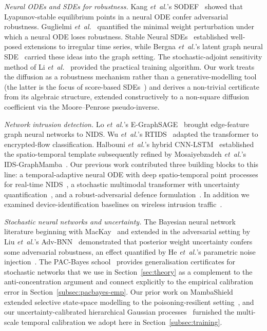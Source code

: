 \documentclass{ieeeaccess}
\begin{document}
\emph{Neural ODEs and SDEs for robustness.} Kang \textit{et~al.}'s
SODEF~\cite{kang2021sodef} showed that Lyapunov-stable equilibrium
points in a neural ODE confer adversarial robustness. Guglielmi
\textit{et~al.}~\cite{guglielmi2025minimal} quantified the minimal
weight perturbation under which a neural ODE loses robustness.
Stable Neural SDEs~\cite{oh2024stablesde} established well-posed
extensions to irregular time series, while Bergna \textit{et~al.}'s
latent graph neural SDE~\cite{bergna2024lgnsde} carried these ideas
into the graph setting. The stochastic-adjoint sensitivity method of
Li \textit{et~al.}~\cite{li2020scalable} provided the practical
training algorithm. Our work treats the diffusion as a robustness
mechanism rather than a generative-modelling tool (the latter is the
focus of score-based SDEs~\cite{song2021score}) and derives a
non-trivial certificate from its algebraic structure, extended
constructively to a non-square diffusion coefficient via the
Moore--Penrose pseudo-inverse.

\emph{Network intrusion detection.} Lo \textit{et~al.}'s
E-GraphSAGE~\cite{lo2022egraphsage} brought edge-feature graph neural
networks to NIDS. Wu \textit{et~al.}'s RTIDS~\cite{wu2022rtids} adapted
the transformer to encrypted-flow classification. Halbouni
\textit{et~al.}'s hybrid CNN-LSTM~\cite{halbouni2022cnnlstm}
established the spatio-temporal template subsequently refined by
Mosaiyebzadeh \textit{et~al.}'s
IDS-GraphMamba~\cite{mosaiyebzadeh2025graphmamba}. Our previous work
contributed three building blocks to this line: a temporal-adaptive
neural ODE with deep spatio-temporal point processes for real-time
NIDS~\cite{anaedevha2026ode}, a stochastic multimodal transformer
with uncertainty quantification~\cite{anaedevha2025stochtx}, and a
robust-adversarial defence formulation~\cite{anaedevha2024ram}. In
addition we examined device-identification baselines on wireless
intrusion traffic~\cite{anaedevha2024elcon}.

\emph{Stochastic neural networks and uncertainty.} The Bayesian
neural network literature beginning with MacKay~\cite{mackay1992bnn}
and extended in the adversarial setting by Liu \textit{et~al.}'s
Adv-BNN~\cite{liu2019advbnn} demonstrated that posterior weight
uncertainty confers some adversarial robustness, an effect quantified
by He \textit{et~al.}'s parametric noise injection~\cite{he2019pni}.
The PAC-Bayes school~\cite{mcallester1999pacbayes,dziugaite2017pacbayes,
perezortiz2021pacbayes} provides generalisation certificates for
stochastic networks that we use in Section~\ref{sec:theory} as a
complement to the anti-concentration argument and connect explicitly
to the empirical calibration error in Section~\ref{subsec:pacbayes-emp}.
Our prior work on MambaShield extended selective state-space modelling
to the poisoning-resilient setting~\cite{anaedevha2026mambashield},
and our uncertainty-calibrated hierarchical Gaussian
processes~\cite{anaedevha2026uchgp} furnished the multi-scale temporal
calibration we adopt here in Section~\ref{subsec:training}.
\end{document}
